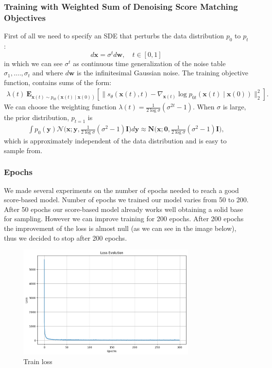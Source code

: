 \documentclass{article}
\begin{document}
\subsubsection{Training with Weighted Sum of Denoising Score Matching Objectives}
First of all we need to specify an SDE that perturbs the data distribution $p_0$ to $p_{t}$:
	\begin{equation}
		d \mathbf{x} = \sigma^t d\mathbf{w}, \quad t\in[0,1]
	\end{equation}
in which we can see $\sigma^t$ as continuous time generalization of the noise table $\sigma_{1},....,\sigma_t$ and where $d\mathbf{w}$ is the infinitesimal Gaussian noise. The training objective function, contains sums of the form:
\begin{align*}
\lambda(t)\  \mathbf{E}_{\mathbf{x}(t) \sim p_{0t}(\mathbf{x}(t) \mid \mathbf{x}(0))}[ \|s_\theta(\mathbf{x}(t), t) - \nabla_{\mathbf{x}(t)}\log p_{0t}(\mathbf{x}(t) \mid \mathbf{x}(0))\|_2^2].
\end{align*}
We can choose the weighting function $\lambda(t) = \frac{1}{2 \log \sigma}(\sigma^{2t} - 1)$. When $\sigma$ is large, the prior distribution, $p_{t=1}$ is
\begin{align*}
\int p_0(\mathbf{y})\mathcal{N}\bigg(\mathbf{x}; \mathbf{y}, \frac{1}{2 \log \sigma}(\sigma^2 - 1)\mathbf{I}\bigg) d \mathbf{y} \approx \mathbf{N}\bigg(\mathbf{x}; \mathbf{0}, \frac{1}{2 \log \sigma}(\sigma^2 - 1)\mathbf{I}\bigg),
\end{align*}
which is approximately independent of the data distribution and is easy to sample from.
\subsubsection{Epochs}
We made several experiments on the number of epochs needed to reach a good score-based model. Number of epochs we trained our model varies from 50 to 200. After 50 epochs our score-based model already works well obtaining a solid base for sampling. However we can improve training for 200 epochs. After 200 epochs the improvement of the loss is almost null (as we can see in the image below), thus we decided to stop after 200 epochs.
\begin{figure}[htbp]
    \centering
    \includegraphics[width=0.8\textwidth]{loss} 
    \caption{Train loss}
\end{figure}
\end{document}

